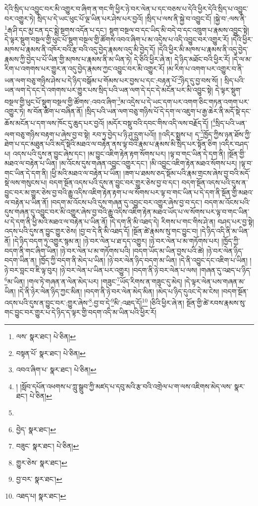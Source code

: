 དེའི་སྲིད་པ་འབྱུང་བར་མི་འགྱུར་བ་ཞིག་ན་གང་གི་ཕྱིར་ཉེ་བར་ལེན་པ་དང་བཅས་པ་དེའི་ཕྱིར་དེའི་སྲིད་པ་འབྱུང་བར་འགྱུར་ཏེ། སྲིད་པ་དེ་ཡང་ཕུང་པོ་ལྔ་ཡིན་པར་ཤེས་པར་བྱའོ། །སྲིད་པ་ལས་ནི་སྐྱེ་བ་འབྱུང་ངོ། །སྐྱེ་བ་:ལས་ནི་\footnote{ལས་  སྣར་ཐང་།  པེ་ཅིན། }རྒ་ཤི་དང་མྱ་ངན་དང་སྨྲེ་སྔགས་འདོན་པ་དང་། སྡུག་བསྔལ་བ་དང་ཡིད་མི་བདེ་བ་དང་འཁྲུག་པ་རྣམས་འབྱུང་སྟེ། དེ་ལྟར་སྡུག་བསྔལ་གྱི་ཕུང་པོ་སྡུག་བསྔལ་གྱི་ཚོགས་འབའ་ཞིག་པ་མ་འདྲེས་པ་འདི་འབྱུང་བར་འགྱུར་རོ། །དེའི་ཕྱིར་མཁས་པ་རྣམས་ནི་འཁོར་བའི་རྩ་བའི་འདུ་བྱེད་རྣམས་འདུ་མི་བྱེད་དོ། །དེའི་ཕྱིར་མི་མཁས་པ་རྣམས་ནི་འདུ་བྱེད་རྣམས་ཀྱི་བྱེད་པ་པོ་ཡིན་གྱི་མཁས་པ་རྣམས་ནི་མ་ཡིན་ཏེ། དེ་ཅིའི་ཕྱིར་ཞེ་ན། དེ་ཉིད་མཐོང་བའི་ཕྱིར་རོ། །དེ་ལ་མ་རིག་པ་འགགས་པར་གྱུར་ན་འདུ་བྱེད་རྣམས་ཀྱང་འབྱུང་བར་མི་འགྱུར་རོ། །མ་རིག་པ་འགག་པར་འགྱུར་བ་ནི་ཡན་ལག་བཅུ་གཉིས་ཤེས་པ་དེ་ཉིད་བསྒོམ་པ་གོམས་པར་བྱས་པ་དང་:བརྟན་པོ་\footnote{བསྟན་པོ་  སྣར་ཐང་།  པེ་ཅིན། }ཉིད་དུ་བྱ་བས་སོ། །
སྲིད་པའི་ཡན་ལག་དེ་དང་དེ་འགགས་པར་གྱུར་པས་སྲིད་པའི་ཡན་ལག་དེ་དང་དེ་མངོན་པར་མི་འབྱུང་སྟེ། དེ་ལྟར་སྡུག་བསྔལ་གྱི་ཕུང་པོ་སྡུག་བསྔལ་གྱི་ཚོགས་:འབའ་ཞིག་\footnote{འབའ་ཞིག་པ་  སྣར་ཐང་།  པེ་ཅིན། }མ་འདྲེས་པ་དེ་ཡང་དག་པར་འགག་ཅིང་གཏན་འགག་པར་འགྱུར་ཏེ། ས་བོན་ཚིག་པ་བཞིན་ནོ། །སྲིད་པའི་ཡན་ལག་བཅུ་གཉིས་པོ་དེ་དག་ལ་འཇུག་པ་རྒྱ་ཆེར་ནི་མདོ་སྡེ་དང་ཆོས་མངོན་པ་དག་ལས་ཁོང་དུ་ཆུད་པར་བྱའོ། །མདོར་བསྡུ་བའི་དབང་གིས་འདི་ལས་བརྗོད་དོ། །\footnote{། །སློབ་དཔོན་འཕགས་པ་ཀླུ་སྒྲུབ་ཀྱི་མཛད་པ་དབུ་མའི་རྩ་བའི་འགྲེལ་པ་ག་ལས་འཇིགས་མེད་ལས་  སྣར་ཐང་།  པེ་ཅིན། }སྲིད་པའི་ཡན་ལག་བཅུ་གཉིས་བརྟག་པ་ཞེས་བྱ་བ་སྟེ། རབ་ཏུ་བྱེད་པ་ཉི་ཤུ་དྲུག་པའོ།། །།འདིར་སྨྲས་པ། ད་\footnote{}ཁྱོད་ཀྱིས་ཉན་ཐོས་ཀྱི་ཐེག་པ་དང་མཐུན་པའི་མདོ་སྡེའི་མཐའ་ལ་བརྟེན་ནས་ལྟ་བའི་རྣམ་པ་རྣམས་མི་སྲིད་པར་སྟོན་ཅིག །འདིར་བཤད་པ། འདས་པའི་དུས་ན་བྱུང་ཞེས་དང་། །མ་བྱུང་འཇིག་རྟེན་རྟག་སོགས་པར། །ལྟ་བ་གང་ཡིན་དེ་དག་ནི། །སྔོན་གྱི་མཐའ་ལ་བརྟེན་པ་ཡིན། །མ་འོངས་དུས་གཞན་འབྱུང་འགྱུར་དང་། །མི་འབྱུང་འཇིག་རྟེན་མཐའ་སོགས་པར། །ལྟ་བ་གང་ཡིན་དེ་དག་ནི། །ཕྱི་མའི་མཐའ་ལ་བརྟེན་པ་ཡིན། །ཟག་པ་ཐམས་ཅད་སྡོམ་པའི་རྣམ་གྲངས་ཞེས་བྱ་བའི་མདོ་སྡེ་ལས་གསུངས་པ། བདག་སྔོན་འདས་པའི་དུས་ན་བྱུང་བར་གྱུར་ཅེས་བྱ་བ་དང་། བདག་སྔོན་འདས་པའི་དུས་ན་བྱུང་བར་མ་གྱུར་ཅེས་བྱ་བའི་རྒྱུ་འདིས་འཇིག་རྟེན་རྟག་པ་ལ་སོགས་པར་ལྟ་བ་གང་ཡིན་པ་དེ་དག་ནི་སྔོན་གྱི་མཐའ་ལ་བརྟེན་པ་ཡིན་ནོ། །བདག་མ་འོངས་པའི་དུས་གཞན་དུ་འབྱུང་བར་འགྱུར་ཞེས་བྱ་བ་དང་། བདག་མ་འོངས་པའི་དུས་གཞན་དུ་འབྱུང་བར་མི་འགྱུར་ཞེས་བྱ་བའི་རྒྱུ་འདིས་འཇིག་རྟེན་མཐའ་ཡོད་པ་ལ་སོགས་པར་ལྟ་བ་གང་ཡིན་པ་དེ་དག་ནི་ཕྱི་མའི་མཐའ་ལ་བརྟེན་པ་ཡིན་ནོ། །དེ་དག་ནི་མི་འཐད་དེ། རིགས་པ་གང་གིས་ཤེ་ན། བཤད་པར་བྱ་སྟེ། འདས་པའི་དུས་ན་བྱུང་གྱུར་ཅེས། །བྱ་བ་དེ་ནི་མི་འཐད་དོ། །སྔོན་ཚེ་རྣམས་སུ་གང་བྱུང་བ། །དེ་ཉིད་འདི་ནི་མ་ཡིན་ནོ། །དེ་ཉིད་བདག་ཏུ་འགྱུར་སྙམ་ན། །ཉེ་བར་ལེན་པ་ཐ་དད་འགྱུར། །ཉེ་བར་ལེན་པ་མ་གཏོགས་པར། །ཁྱོད་ཀྱི་བདག་ནི་གང་ཞིག་ཡིན། །ཉེ་བར་ལེན་པ་མ་གཏོགས་པའི། །བདག་ཡོད་མ་ཡིན་བྱས་པའི་ཚེ། །ཉེ་བར་ལེན་ཉིད་བདག་ཡིན་ན། །ཁྱོད་ཀྱི་བདག་ནི་མེད་པ་ཡིན། །ཉེ་བར་ལེན་ཉིད་བདག་མ་ཡིན། །དེ་ནི་འབྱུང་དང་འཇིག་པ་ཡིན། །ཉེ་བར་བླང་བ་ཇི་ལྟ་བུར། །ཉེ་བར་ལེན་པ་ཡིན་པར་འགྱུར། །བདག་ནི་ཉེ་བར་ལེན་པ་ལས། །གཞན་དུ་འཐད་པ་ཉིད་\footnote{བྱེད་  སྣར་ཐང་། }མ་ཡིན། །གལ་ཏེ་གཞན་ན་ལེན་མེད་པར། །གཟུང་\footnote{བཟུང་  སྣར་ཐང་།  པེ་ཅིན། }ཡོད་རིགས་ན་གཟུང་དུ་མེད། །དེ་ལྟར་ལེན་པས་གཞན་མ་ཡིན། །དེ་ནི་ཉེར་ལེན་ཉིད་ཀྱང་མིན། །བདག་ནི་ཉེ་བར་ལེན་མེད་མིན། །མེད་པ་ཉིད་དུའང་དེ་མ་ངེས། །བདག་སྔོན་འདས་པའི་དུས་ན་བྱུང་བར་:གྱུར་ཞེས་\footnote{གྱུར་ཅེས་  སྣར་ཐང་། }:བྱ་བ་དེ་\footnote{བྱ་བར་  སྣར་ཐང་། }མི་:འཐད་དོ།\footnote{འཐད་པ།  སྣར་ཐང་། } །ཅིའི་ཕྱིར་ཞེ་ན། སྔོན་གྱི་ཚེ་རབས་རྣམས་སུ་གང་བྱུང་བར་གྱུར་པ་དེ་ཉིད་ད་ལྟར་གྱི་བདག་འདི་མ་ཡིན་པའི་ཕྱིར་རོ། 